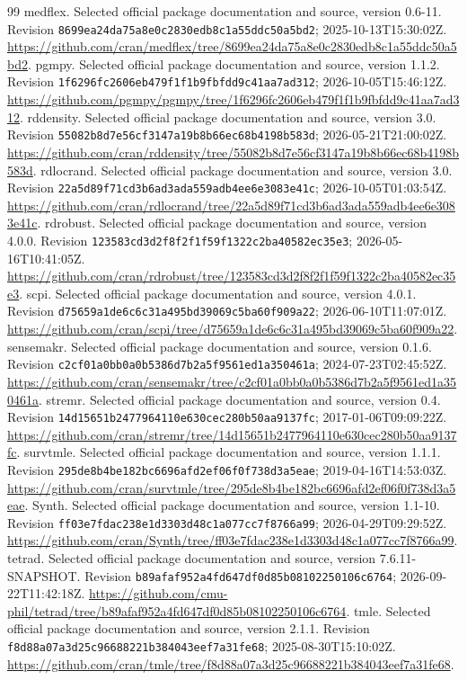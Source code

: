\begin{thebibliography}{99}
 medflex. Selected official package documentation and source, version 0.6-11. Revision \nolinkurl{8699ea24da75a8e0c2830edb8c1a55ddc50a5bd2}; 2025-10-13T15:30:02Z. \url{https://github.com/cran/medflex/tree/8699ea24da75a8e0c2830edb8c1a55ddc50a5bd2}.
 pgmpy. Selected official package documentation and source, version 1.1.2. Revision \nolinkurl{1f6296fc2606eb479f1f1b9fbfdd9c41aa7ad312}; 2026-10-05T15:46:12Z. \url{https://github.com/pgmpy/pgmpy/tree/1f6296fc2606eb479f1f1b9fbfdd9c41aa7ad312}.
 rddensity. Selected official package documentation and source, version 3.0. Revision \nolinkurl{55082b8d7e56cf3147a19b8b66ec68b4198b583d}; 2026-05-21T21:00:02Z. \url{https://github.com/cran/rddensity/tree/55082b8d7e56cf3147a19b8b66ec68b4198b583d}.
 rdlocrand. Selected official package documentation and source, version 3.0. Revision \nolinkurl{22a5d89f71cd3b6ad3ada559adb4ee6e3083e41c}; 2026-10-05T01:03:54Z. \url{https://github.com/cran/rdlocrand/tree/22a5d89f71cd3b6ad3ada559adb4ee6e3083e41c}.
 rdrobust. Selected official package documentation and source, version 4.0.0. Revision \nolinkurl{123583cd3d2f8f2f1f59f1322c2ba40582ec35e3}; 2026-05-16T10:41:05Z. \url{https://github.com/cran/rdrobust/tree/123583cd3d2f8f2f1f59f1322c2ba40582ec35e3}.
 scpi. Selected official package documentation and source, version 4.0.1. Revision \nolinkurl{d75659a1de6c6c31a495bd39069c5ba60f909a22}; 2026-06-10T11:07:01Z. \url{https://github.com/cran/scpi/tree/d75659a1de6c6c31a495bd39069c5ba60f909a22}.
 sensemakr. Selected official package documentation and source, version 0.1.6. Revision \nolinkurl{c2cf01a0bb0a0b5386d7b2a5f9561ed1a350461a}; 2024-07-23T02:45:52Z. \url{https://github.com/cran/sensemakr/tree/c2cf01a0bb0a0b5386d7b2a5f9561ed1a350461a}.
 stremr. Selected official package documentation and source, version 0.4. Revision \nolinkurl{14d15651b2477964110e630cec280b50aa9137fc}; 2017-01-06T09:09:22Z. \url{https://github.com/cran/stremr/tree/14d15651b2477964110e630cec280b50aa9137fc}.
 survtmle. Selected official package documentation and source, version 1.1.1. Revision \nolinkurl{295de8b4be182bc6696afd2ef06f0f738d3a5eae}; 2019-04-16T14:53:03Z. \url{https://github.com/cran/survtmle/tree/295de8b4be182bc6696afd2ef06f0f738d3a5eae}.
 Synth. Selected official package documentation and source, version 1.1-10. Revision \nolinkurl{ff03e7fdac238e1d3303d48c1a077cc7f8766a99}; 2026-04-29T09:29:52Z. \url{https://github.com/cran/Synth/tree/ff03e7fdac238e1d3303d48c1a077cc7f8766a99}.
 tetrad. Selected official package documentation and source, version 7.6.11-SNAPSHOT. Revision \nolinkurl{b89afaf952a4fd647df0d85b08102250106c6764}; 2026-09-22T11:42:18Z. \url{https://github.com/cmu-phil/tetrad/tree/b89afaf952a4fd647df0d85b08102250106c6764}.
 tmle. Selected official package documentation and source, version 2.1.1. Revision \nolinkurl{f8d88a07a3d25c96688221b384043eef7a31fe68}; 2025-08-30T15:10:02Z. \url{https://github.com/cran/tmle/tree/f8d88a07a3d25c96688221b384043eef7a31fe68}.
\end{thebibliography}
